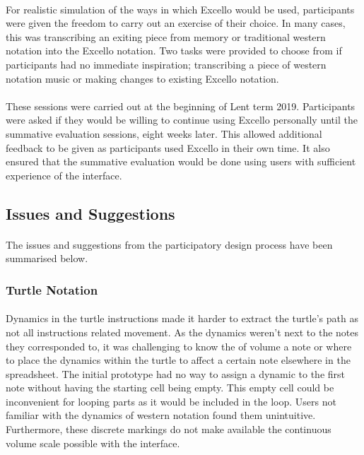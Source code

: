 \paragraph{} For realistic simulation of the ways in which Excello would be used, participants were given the freedom to carry out an exercise of their choice. In many cases, this was transcribing an exiting piece from memory or traditional western notation into the Excello notation. Two tasks were provided to choose from if participants had no immediate inspiration; transcribing a piece of western notation music or making changes to existing Excello notation.

\paragraph{} These sessions were carried out at the beginning of Lent term 2019. Participants were asked if they would be willing to continue using Excello personally until the summative evaluation sessions, eight weeks later. This allowed additional feedback to be given as participants used Excello in their own time. It also ensured that the summative evaluation would be done using users with sufficient experience of the interface.

\subsection{Issues and Suggestions}

\paragraph{} The issues and suggestions from the participatory design process have been summarised below.

\subsubsection{Turtle Notation}

\paragraph{} Dynamics in the turtle instructions made it harder to extract the turtle's path as not all instructions related movement. As the dynamics weren't next to the notes they corresponded to, it was challenging to know the of volume a note or where to place the dynamics within the turtle to affect a certain note elsewhere in the spreadsheet. The initial prototype had no way to assign a dynamic to the first note without having the starting cell being empty. This empty cell could be inconvenient for looping parts as it would be included in the loop. Users not familiar with the dynamics of western notation found them unintuitive. Furthermore, these discrete markings do not make available the continuous volume scale possible with the interface.

